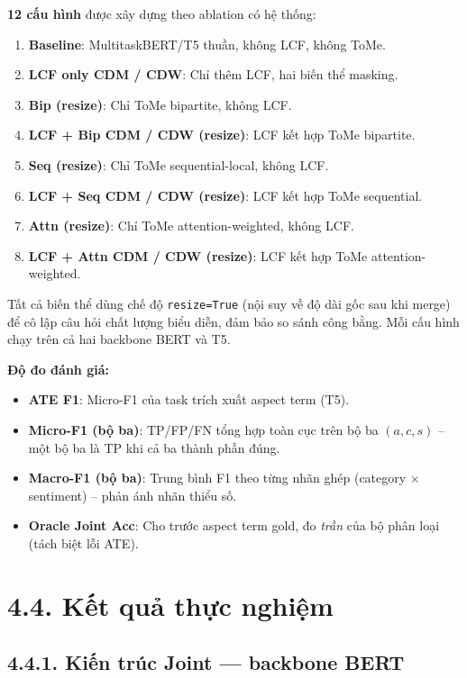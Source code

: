 \textbf{12 cấu hình} được xây dựng theo ablation có hệ thống:

\begin{enumerate}
  \item \textbf{Baseline}: MultitaskBERT/T5 thuần, không LCF, không ToMe.
  \item \textbf{LCF only CDM / CDW}: Chỉ thêm LCF, hai biến thể masking.
  \item \textbf{Bip (resize)}: Chỉ ToMe bipartite, không LCF.
  \item \textbf{LCF + Bip CDM / CDW (resize)}: LCF kết hợp ToMe bipartite.
  \item \textbf{Seq (resize)}: Chỉ ToMe sequential-local, không LCF.
  \item \textbf{LCF + Seq CDM / CDW (resize)}: LCF kết hợp ToMe sequential.
  \item \textbf{Attn (resize)}: Chỉ ToMe attention-weighted, không LCF.
  \item \textbf{LCF + Attn CDM / CDW (resize)}: LCF kết hợp ToMe
        attention-weighted.
\end{enumerate}

Tất cả biến thể dùng chế độ \texttt{resize=True} (nội suy về độ dài
gốc sau khi merge) để cô lập câu hỏi chất lượng biểu diễn, đảm bảo
so sánh công bằng. Mỗi cấu hình chạy trên cả hai backbone BERT và T5.

\textbf{Độ đo đánh giá:}
\begin{itemize}
  \item \textbf{ATE F1}: Micro-F1 của task trích xuất aspect term (T5).
  \item \textbf{Micro-F1 (bộ ba)}: TP/FP/FN tổng hợp toàn cục trên
        bộ ba $(a, c, s)$ -- một bộ ba là TP khi cả ba thành phần đúng.
  \item \textbf{Macro-F1 (bộ ba)}: Trung bình F1 theo từng nhãn ghép
        (category $\times$ sentiment) -- phản ánh nhãn thiểu số.
  \item \textbf{Oracle Joint Acc}: Cho trước aspect term gold, đo
        \emph{trần} của bộ phân loại (tách biệt lỗi ATE).
\end{itemize}

\section{4.4.\; Kết quả thực nghiệm}
\label{sec:results}

\subsection{4.4.1.\; Kiến trúc Joint — backbone BERT}

